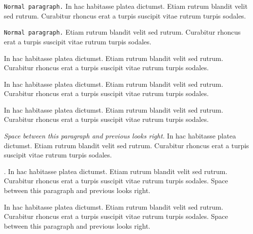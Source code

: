 
 
{\tt Normal paragraph.} In hac habitasse platea dictumst. Etiam rutrum blandit velit sed
rutrum. Curabitur rhoncus erat a turpis suscipit vitae rutrum turpis
sodales.

{\tt Normal paragraph.} Etiam rutrum blandit velit sed
rutrum. Curabitur rhoncus erat a turpis suscipit vitae rutrum turpis
sodales.

\startrule{} In hac habitasse platea dictumst. Etiam rutrum
blandit velit sed rutrum. Curabitur rhoncus erat a turpis suscipit
vitae rutrum turpis sodales.  \endrule

 In
hac habitasse platea dictumst. Etiam rutrum blandit velit sed
rutrum. Curabitur rhoncus erat a turpis suscipit vitae rutrum turpis
sodales.  
\endrule{}

\startrule{}
In hac habitasse platea dictumst. Etiam rutrum blandit velit sed
rutrum. Curabitur rhoncus erat a turpis suscipit vitae rutrum turpis
sodales.
\endrule

{\it Space between this paragraph and previous looks right.} In hac habitasse platea dictumst. Etiam rutrum blandit velit sed
rutrum. Curabitur rhoncus erat a turpis suscipit vitae rutrum turpis
sodales.

. In hac habitasse
platea dictumst. Etiam rutrum blandit velit sed rutrum. Curabitur
rhoncus erat a turpis suscipit vitae rutrum turpis sodales. Space
between this paragraph and previous looks right.

In hac habitasse platea dictumst. Etiam rutrum blandit velit sed
rutrum. Curabitur rhoncus erat a turpis suscipit vitae rutrum turpis
sodales. Space between this paragraph and previous looks right. 
\endrule

\bye

